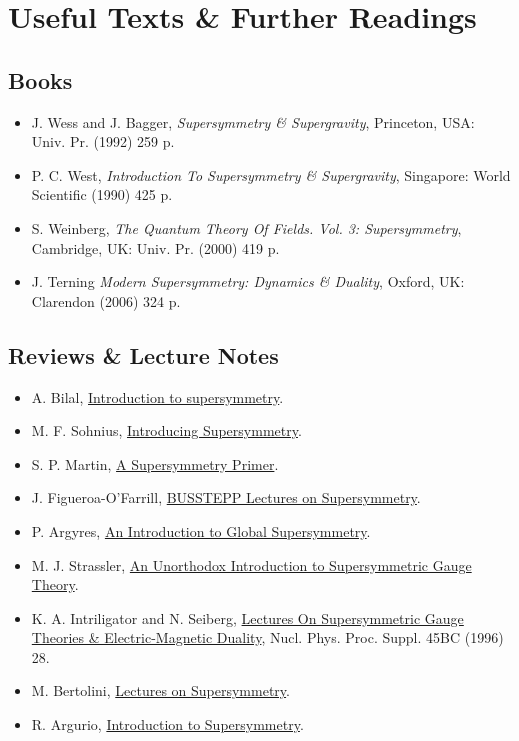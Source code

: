 \chapter*{Useful Texts \& Further Readings}

\section*{Books}
\begin{itemize}
    \item J. Wess and J. Bagger, \textit{Supersymmetry \& Supergravity}, Princeton, USA: Univ. Pr. (1992) 259 p. 
    \item P. C. West, \textit{Introduction To Supersymmetry \& Supergravity}, Singapore: World Scientific (1990) 425 p.
    \item S. Weinberg, \textit{The Quantum Theory Of Fields. Vol. 3: Supersymmetry}, Cambridge, UK: Univ. Pr. (2000) 419 p.
    \item J. Terning \textit{Modern Supersymmetry: Dynamics \& Duality}, Oxford, UK: Clarendon (2006) 324 p.
\end{itemize}

\section*{Reviews \& Lecture Notes}
\begin{itemize}
    \item A. Bilal, \href{https://arxiv.org/pdf/hep-th/0101055.pdf}{Introduction to supersymmetry}.
    \item M. F. Sohnius, \href{https://www.sciencedirect.com/science/article/abs/pii/0370157385900237?via\%3Dihub}{Introducing Supersymmetry}.
    \item S. P. Martin, \href{https://arxiv.org/pdf/hep-ph/9709356.pdf}{A Supersymmetry Primer}.
    \item J. Figueroa-O’Farrill, \href{https://arxiv.org/pdf/hep-th/0109172.pdf}{BUSSTEPP Lectures on Supersymmetry}.
    \item P. Argyres, \href{https://homepages.uc.edu/~argyrepc/cu661-gr-SUSY/index.html}{An Introduction to Global Supersymmetry}.
    \item M. J. Strassler, \href{https://arxiv.org/pdf/hep-th/0309149.pdf}{An Unorthodox Introduction to Supersymmetric Gauge Theory}.
    \item K. A. Intriligator and N. Seiberg, \href{https://arxiv.org/pdf/hep-th/9509066.pdf}{Lectures On Supersymmetric Gauge Theories \& Electric-Magnetic Duality}, Nucl. Phys. Proc. Suppl. 45BC (1996) 28.
    \item M. Bertolini, \href{https://people.sissa.it/~bertmat/susycourse.pdf}{Lectures on Supersymmetry}.
    \item R. Argurio, \href{http://homepages.ulb.ac.be/~rargurio/susycourse.pdf}{Introduction to Supersymmetry}.
\end{itemize}